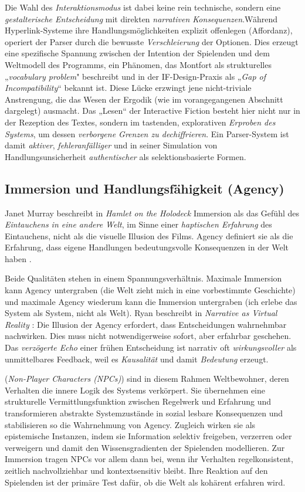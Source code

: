 \documentclass[parskip=half,a4paper,11pt]{scrreprt}
\begin{document}
Die Wahl des \textit{Interaktionsmodus} ist dabei keine rein technische, sondern eine \textit{gestalterische Entscheidung }mit direkten \textit{narrativen Konsequenzen}.Während Hyperlink-Systeme ihre Handlungsmöglichkeiten explizit offenlegen (Affordanz), operiert der Parser durch die bewusste \textit{Verschleierung }der Optionen. Dies erzeugt eine spezifische Spannung zwischen der Intention der Spielenden und dem Weltmodell des Programms, ein Phänomen, das Montfort als strukturelles „\textit{vocabulary problem}" beschreibt \citep[Kap.~3]{Montfort2003} und in der IF-Design-Praxis als „\textit{Gap of Incompatibility}“ bekannt ist. Diese Lücke erzwingt jene nicht-triviale Anstrengung, die das Wesen der Ergodik (wie im vorangegangenen Abschnitt dargelegt) ausmacht. Das „Lesen“ der Interactive Fiction besteht hier nicht nur in der Rezeption des Textes, sondern im tastenden, explorativen \textit{Erproben des Systems}, um dessen\textit{ verborgene Grenzen zu dechiffrieren}. Ein Parser-System ist damit\textit{ aktiver}, \textit{fehleranfälliger} und in seiner Simulation von Handlungsunsicherheit \textit{authentischer} als selektionsbasierte Formen.

\subsection{Immersion und Handlungsfähigkeit (Agency)}

Janet Murray beschreibt in \textit{Hamlet on the Holodeck}\textbf{ }Immersion als das Gefühl des \textit{Eintauchens in eine andere Welt}, im Sinne einer\textit{ haptischen Erfahrung} des Eintauchens, nicht als die visuelle Illusion des Films. Agency definiert sie als die Erfahrung, dass eigene Handlungen bedeutungsvolle Konsequenzen in der Welt haben \citep{Murray1997}. 

Beide Qualitäten stehen in einem Spannungsverhältnis. Maximale Immersion kann Agency untergraben (die Welt zieht mich in eine vorbestimmte Geschichte) und maximale Agency wiederum kann die Immersion untergraben (ich erlebe das System als System, nicht als Welt). Ryan beschreibt in \textit{Narrative as Virtual Reality} \citep{Ryan2001}: Die Illusion der Agency erfordert, dass Entscheidungen wahrnehmbar nachwirken. Dies muss nicht notwendigerweise sofort, aber erfahrbar geschehen. Das \textit{verzögerte Echo }einer frühen Entscheidung ist narrativ oft \textit{wirkungsvoller }als unmittelbares Feedback, weil es \textit{Kausalität} und damit\textit{ Bedeutung} erzeugt. 

(\textit{Non-Player Characters (NPCs)}) sind in diesem Rahmen Weltbewohner, deren Verhalten die innere Logik des Systems verkörpert. Sie übernehmen eine strukturelle Vermittlungsfunktion zwischen Regelwerk und Erfahrung und transformieren abstrakte Systemzustände in sozial lesbare Konsequenzen und stabilisieren so die Wahrnehmung von Agency. Zugleich wirken sie als epistemische Instanzen, indem sie Information selektiv freigeben, verzerren oder verweigern und damit den Wissensgradienten der Spielenden modellieren. Zur Immersion tragen NPCs vor allem dann bei, wenn ihr Verhalten regelkonsistent, zeitlich nachvollziehbar und kontextsensitiv bleibt. Ihre Reaktion auf den Spielenden ist der primäre Test dafür, ob die Welt als kohärent erfahren wird.
\end{document}
